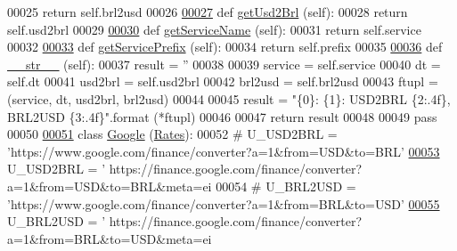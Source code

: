 \begin{DoxyCode}
00025         \textcolor{keywordflow}{return} self.brl2usd
00026     
\hyperlink{namespacerates_ae4c7203ef8a919f9cf522581ca00b08a}{00027}     \textcolor{keyword}{def }\hyperlink{namespacerates_ae4c7203ef8a919f9cf522581ca00b08a}{getUsd2Brl} (self):
00028         \textcolor{keywordflow}{return} self.usd2brl
00029     
\hyperlink{namespacerates_a5dd7b6601bc66e313c26984e32f1e290}{00030}     \textcolor{keyword}{def }\hyperlink{namespacerates_a5dd7b6601bc66e313c26984e32f1e290}{getServiceName} (self):
00031         \textcolor{keywordflow}{return} self.service
00032     
\hyperlink{namespacerates_aafc179b32863137b88c74dd0ee2576bd}{00033}     \textcolor{keyword}{def }\hyperlink{namespacerates_aafc179b32863137b88c74dd0ee2576bd}{getServicePrefix} (self):
00034         \textcolor{keywordflow}{return} self.prefix
00035         
\hyperlink{namespacerates_a2f1a70c33ee9e255938e4c19fd207264}{00036}     \textcolor{keyword}{def }\hyperlink{namespacerates_a2f1a70c33ee9e255938e4c19fd207264}{\_\_str\_\_} (self):
00037         result = \textcolor{stringliteral}{''}
00038 
00039         service = self.service
00040         dt      = self.dt
00041         usd2brl = self.usd2brl
00042         brl2usd = self.brl2usd
00043         ftupl = (service, dt, usd2brl, brl2usd)
00044         
00045         result = \textcolor{stringliteral}{"\{0\}: \{1\}: USD2BRL \{2:.4f\}, BRL2USD \{3:.4f\}"}.format (*ftupl)
00046 
00047         \textcolor{keywordflow}{return} result        
00048     
00049     \textcolor{keywordflow}{pass} 
00050     
\hyperlink{classrates_1_1_google}{00051} \textcolor{keyword}{class }\hyperlink{classrates_1_1_google}{Google} (\hyperlink{classrates_1_1_rates}{Rates}):
00052     \textcolor{comment}{#    U\_USD2BRL = 'https://www.google.com/finance/converter?a=1&from=USD&to=BRL'}
\hyperlink{classrates_1_1_google_a77ef7f5932c48b002697fb187a234d4a}{00053}     U\_USD2BRL = \textcolor{stringliteral}{'
      https://finance.google.com/finance/converter?a=1&from=USD&to=BRL&meta=ei%
00054 \textcolor{comment}{#    U\_BRL2USD = 'https://www.google.com/finance/converter?a=1&from=BRL&to=USD'}
\hyperlink{classrates_1_1_google_a46dbc3fa0a110bf5b66808c29642cfa1}{00055}     U\_BRL2USD = \textcolor{stringliteral}{'
      https://finance.google.com/finance/converter?a=1&from=BRL&to=USD&meta=ei%
}}
\end{DoxyCode}
